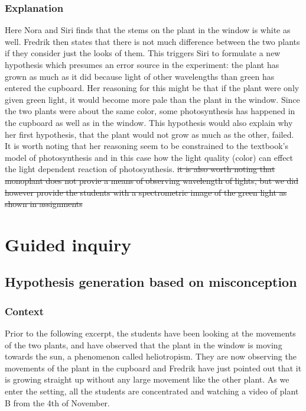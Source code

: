 \subsubsection*{Explanation}
Here Nora and Siri finds that the stems on the plant in the window is white as well. Fredrik then states that there is not much difference between the two plants if they consider just the looks of them. This triggers Siri to formulate a new hypothesis which presumes an error source in the experiment: the plant has grown as much as it did because light of other wavelengths than green has entered the cupboard. Her reasoning for this might be that if the plant were only given green light, it would become more pale than the plant in the window. Since the two plants were about the same color, some photosynthesis has happened in the cupboard as well as in the window.
This hypothesis would also explain why her first hypothesis, that the plant would not grow as much as the other, failed. It is worth noting that her reasoning seem to be constrained to the textbook's model of photosynthesis and in this case how the light quality (color) can effect the light dependent reaction of photosynthesis. \sout{it is also worth noting that monoplant does not provie a means of observing wavelength of lights, but we did however provide the students with a spectrometric image of the green light as shown in assignments}

\section{Guided inquiry}
\label{cha:guidedinquiry}

\subsection{Hypothesis generation based on misconception}

\subsubsection*{Context}
Prior to the following excerpt, the students have been looking at the movements of the two plants, and have observed that the plant in the window is moving towards the sun, a phenomenon called heliotropism. They are now observing the movements of the plant in the cupboard and Fredrik have just pointed out that it is growing straight up without any large movement like the other plant. As we enter the setting, all the students are concentrated and watching a video of plant B from the 4th of November.


